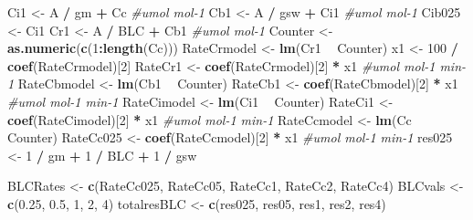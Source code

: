 \documentclass[
]{krantz}
\makeatletter
\newenvironment{Shaded}{\begin{snugshade}}{\end{snugshade}}
\newcommand{\CommentTok}[1]{\textcolor[rgb]{0.56,0.35,0.01}{\textit{#1}}}
\newcommand{\DecValTok}[1]{\textcolor[rgb]{0.00,0.00,0.81}{#1}}
\newcommand{\FloatTok}[1]{\textcolor[rgb]{0.00,0.00,0.81}{#1}}
\newcommand{\KeywordTok}[1]{\textcolor[rgb]{0.13,0.29,0.53}{\textbf{#1}}}
\newcommand{\NormalTok}[1]{#1}
\newcommand{\OperatorTok}[1]{\textcolor[rgb]{0.81,0.36,0.00}{\textbf{#1}}}
\newcommand{\StringTok}[1]{\textcolor[rgb]{0.31,0.60,0.02}{#1}}
\newenvironment{kframe}{%
\medskip{}
\setlength{\fboxsep}{.8em}
 \def\at@end@of@kframe{}%
 \ifinner\ifhmode%
  \def\at@end@of@kframe{\end{minipage}}%
  \begin{minipage}{\columnwidth}%
 \fi\fi%
 \def\FrameCommand##1{\hskip\@totalleftmargin \hskip-\fboxsep
 \colorbox{shadecolor}{##1}\hskip-\fboxsep
     \hskip-\linewidth \hskip-\@totalleftmargin \hskip\columnwidth}%
 \MakeFramed {\advance\hsize-\width
   \@totalleftmargin\z@ \linewidth\hsize
   \@setminipage}}%
 {\par\unskip\endMakeFramed%
 \at@end@of@kframe}
\renewenvironment{Shaded}{\begin{kframe}}{\end{kframe}}
\makeatother
\begin{document}
\begin{Shaded}
\begin{Highlighting}[]
\NormalTok{Ci1 <-}\StringTok{ }\NormalTok{A }\OperatorTok{/}\StringTok{ }\NormalTok{gm }\OperatorTok{+}\StringTok{ }\NormalTok{Cc }\CommentTok{#umol mol-1}
\NormalTok{Cb1 <-}\StringTok{ }\NormalTok{A }\OperatorTok{/}\StringTok{ }\NormalTok{gsw }\OperatorTok{+}\StringTok{ }\NormalTok{Ci1 }\CommentTok{#umol mol-1}
\NormalTok{Cib025 <-}\StringTok{ }\NormalTok{Ci1}
\NormalTok{Cr1 <-}\StringTok{ }\NormalTok{A }\OperatorTok{/}\StringTok{ }\NormalTok{BLC }\OperatorTok{+}\StringTok{ }\NormalTok{Cb1 }\CommentTok{#umol mol-1}
\NormalTok{Counter <-}\StringTok{ }\KeywordTok{as.numeric}\NormalTok{(}\KeywordTok{c}\NormalTok{(}\DecValTok{1}\OperatorTok{:}\KeywordTok{length}\NormalTok{(Cc)))}
\NormalTok{RateCrmodel <-}\StringTok{ }\KeywordTok{lm}\NormalTok{(Cr1 }\OperatorTok{~}\StringTok{ }\NormalTok{Counter)}
\NormalTok{x1 <-}\StringTok{ }\DecValTok{100} \OperatorTok{/}\StringTok{ }\KeywordTok{coef}\NormalTok{(RateCrmodel)[}\DecValTok{2}\NormalTok{]}
\NormalTok{RateCr1 <-}\StringTok{ }\KeywordTok{coef}\NormalTok{(RateCrmodel)[}\DecValTok{2}\NormalTok{] }\OperatorTok{*}\StringTok{ }\NormalTok{x1 }\CommentTok{#umol mol-1 min-1}
\NormalTok{RateCbmodel <-}\StringTok{ }\KeywordTok{lm}\NormalTok{(Cb1 }\OperatorTok{~}\StringTok{ }\NormalTok{Counter)}
\NormalTok{RateCb1 <-}\StringTok{ }\KeywordTok{coef}\NormalTok{(RateCbmodel)[}\DecValTok{2}\NormalTok{] }\OperatorTok{*}\StringTok{ }\NormalTok{x1 }\CommentTok{#umol mol-1 min-1}
\NormalTok{RateCimodel <-}\StringTok{ }\KeywordTok{lm}\NormalTok{(Ci1 }\OperatorTok{~}\StringTok{ }\NormalTok{Counter)}
\NormalTok{RateCi1 <-}\StringTok{ }\KeywordTok{coef}\NormalTok{(RateCimodel)[}\DecValTok{2}\NormalTok{] }\OperatorTok{*}\StringTok{ }\NormalTok{x1 }\CommentTok{#umol mol-1 min-1}
\NormalTok{RateCcmodel <-}\StringTok{ }\KeywordTok{lm}\NormalTok{(Cc }\OperatorTok{~}\StringTok{ }\NormalTok{Counter)}
\NormalTok{RateCc025 <-}\StringTok{ }\KeywordTok{coef}\NormalTok{(RateCcmodel)[}\DecValTok{2}\NormalTok{] }\OperatorTok{*}\StringTok{ }\NormalTok{x1 }\CommentTok{#umol mol-1 min-1}
\NormalTok{res025 <-}\StringTok{ }\DecValTok{1} \OperatorTok{/}\StringTok{ }\NormalTok{gm }\OperatorTok{+}\StringTok{ }\DecValTok{1} \OperatorTok{/}\StringTok{ }\NormalTok{BLC }\OperatorTok{+}\StringTok{ }\DecValTok{1} \OperatorTok{/}\StringTok{ }\NormalTok{gsw}

\NormalTok{BLCRates <-}\StringTok{ }\KeywordTok{c}\NormalTok{(RateCc025, RateCc05, RateCc1, RateCc2, RateCc4)}
\NormalTok{BLCvals <-}\StringTok{ }\KeywordTok{c}\NormalTok{(}\FloatTok{0.25}\NormalTok{, }\FloatTok{0.5}\NormalTok{, }\DecValTok{1}\NormalTok{, }\DecValTok{2}\NormalTok{, }\DecValTok{4}\NormalTok{)}
\NormalTok{totalresBLC <-}\StringTok{ }\KeywordTok{c}\NormalTok{(res025, res05, res1, res2, res4)}


\end{Highlighting}
\end{Shaded}
\end{document}
